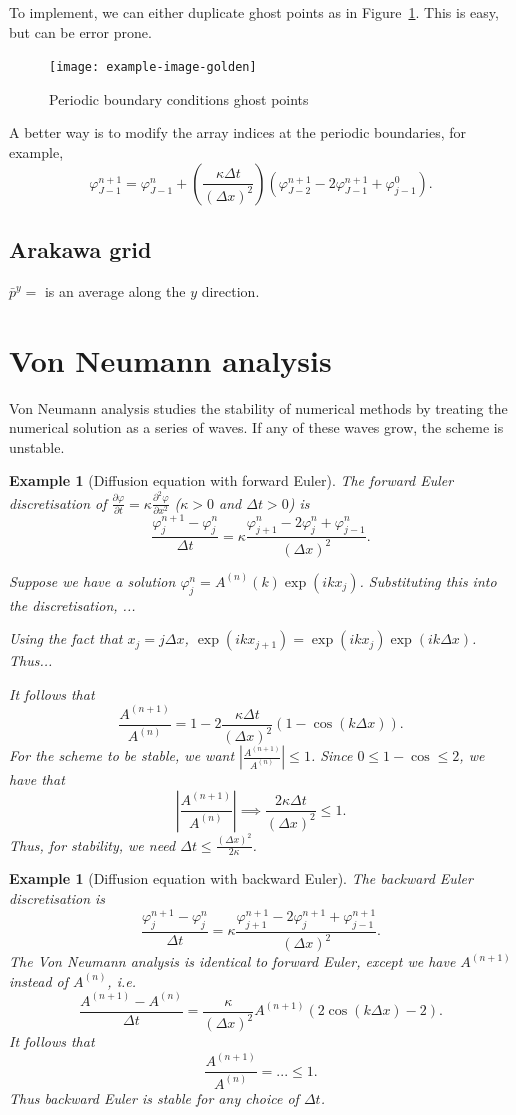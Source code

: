 \documentclass[11pt, a4paper]{article}
\renewcommand{\phi}{\varphi}
\theoremstyle{break}
\newtheorem{eg}[thm]{Example}
\newcommand*{\Size}[1]{{\left|#1\right|}}%
\newcommand*{\Paren}[1]{\left(#1\right)}%
\newcommand{\dt}{\Delta t}
\newcommand{\dx}{\Delta x}
\newcommand{\der}[2]{\frac{\partial #1}{\partial #2}}
\newcommand{\pder}[3][2]{\frac{\partial^#1 #2}{\partial #3^#1}}
\begin{document}
To implement, we can either duplicate ghost points as in Figure~\ref{fig:periodicGhost}. This is easy, but can be error prone.
\begin{figure}\centering
	\texttt{[image: example-image-golden]}
	\caption{Periodic boundary conditions ghost points}\label{fig:periodicGhost}
\end{figure}

A better way is to modify the array indices at the periodic boundaries, for example,\[\phi_{J-1}^{n+1}=\phi_{J-1}^n+\Paren{\frac{\kappa\dt}{(\dx)^2}}\Paren{\phi_{J-2}^{n+1}-2\phi_{J-1}^{n+1}+\phi^{0}_{j-1}}.\]

\subsection{Arakawa grid}

$\bar{p}^y=$ is an average along the $y$ direction.


\section{Von Neumann analysis}
\newcommand{\A}[1]{A^{(#1)}}
Von Neumann analysis studies the stability of numerical methods by treating the numerical solution as a series of waves. If any of these waves grow, the scheme is unstable.
\begin{eg}[Diffusion equation with forward Euler]
	The forward Euler discretisation of $\der\phi t=\kappa\pder\phi x$ ($\kappa>0$ and $\dt>0$) is \[\frac{\phi_j^{n+1}-\phi_j^n}{\dt}=\kappa\frac{\phi_{j+1}^n-2\phi_j^n+\phi^n_{j-1}}{(\dx)^2}.\]
	

	Suppose we have a solution $\phi_j^n=\A{n}(k)\exp(ikx_j)$. Substituting this into the discretisation, ...
	
	Using the fact that $x_j=j\dx$, $\exp(ikx_{j+1})=\exp(ikx_j)\exp(ik\dx)$. Thus...
	
	It follows that \[ \frac{\A{n+1}}{\A n}= 1-2\frac{\kappa \dt}{(\dx)^2}(1-\cos( k\dx)).\] For the scheme to be stable, we want $\Size{\frac{\A{n+1}}{\A n}} \leq1$. Since $0\leq 1-\cos\leq 2$, we have that \[\Size{\frac{\A{n+1}}{\A n}} \implies \frac{2\kappa\dt}{(\dx)^2}\leq 1.\] Thus, for stability, we need $\dt \leq \frac{(\dx)^2}{2\kappa}$.
\end{eg}
\begin{eg}[Diffusion equation with backward Euler]The backward Euler discretisation is 
	\[\frac{\phi_j^{n+1}-\phi_j^n}{\dt}=\kappa\frac{\phi_{j+1}^{n+1}-2\phi_j^{n+1}+\phi^{n+1}_{j-1}}{(\dx)^2}.\] The Von Neumann analysis is identical to forward Euler, except we have $\A{n+1}$ instead of $\A n$, i.e. 
	\[\frac{\A{n+1}-\A n}{\dt}=\frac{\kappa}{(\dx)^2}\A{n+1}(2\cos (k\dx)-2).\] It follows that \[\frac{\A{n+1}}{\A n} =... \leq 1.\] Thus backward Euler is stable for any choice of $\dt$. 
\end{eg}
\end{document}
